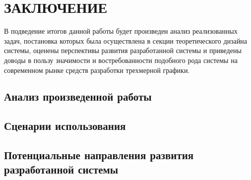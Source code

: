 \section{ЗАКЛЮЧЕНИЕ}
\label{sec:outro}

В подведение итогов данной работы будет произведен анализ реализованных задач, постановка которых была осуществлена в секции теоретического дизайна системы, оценены перспективы развития
разработанной системы и приведены доводы в пользу значимости и востребованности подобного рода системы на современном рынке средств разработки трехмерной графики.

\subsection{Анализ произведенной работы}
\label{sub:outro:overview_outro}


\subsection{Сценарии использования}
\label{sub:domain:scenario}


\subsection{Потенциальные направления развития разработанной системы}
\label{sub:domain:future}


